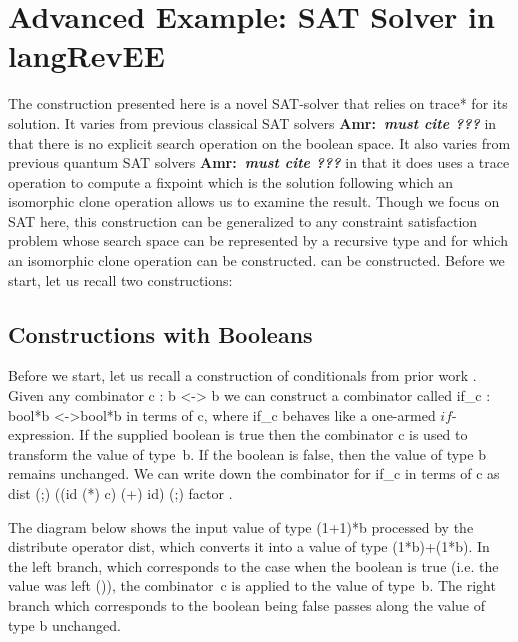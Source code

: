 \documentclass[preprint]{sigplanconf}
\newcommand{\xcomment}[2]{\textbf{#1:~\textsl{#2}}}
\newcommand{\amr}[1]{\xcomment{Amr}{#1}}
\begin{document}
\section{Advanced Example: SAT Solver in {{langRevEE}} }
\label{sec:prog}
\label{sec:sat-solver}


The construction presented here is a novel SAT-solver that relies on
{{trace*}} for its solution. It varies from previous classical SAT solvers
\amr{must cite ???} in that there is no explicit search operation on the
boolean space. It also varies from previous quantum SAT solvers \amr{must
  cite ???} in that it does uses a {{trace}} operation to compute a fixpoint
which is the solution following which an isomorphic clone operation allows us
to examine the result.  Though we focus on SAT here, this construction can be
generalized to any constraint satisfaction problem whose search space can be
represented by a recursive type and for which an isomorphic clone operation
can be constructed. 
can be constructed. Before we start, let us recall two constructions:

\subsection{Constructions with Booleans}

Before we start, let us recall a construction of conditionals from
prior work \cite{infeffects}.  Given any combinator {{c : b <-> b}} we
can construct a combinator called {{if_c : bool*b <->bool*b}} in terms
of {{c}}, where {{if_c}} behaves like a one-armed
$\mathit{if}$-expression. If the supplied boolean is {{true}} then the
combinator {{c}} is used to transform the value of type~{{b}}. If the
boolean is {{false}}, then the value of type {{b}} remains
unchanged. We can write down the combinator for {{if_c}} in terms of
{{c}} as {{ dist (;) ((id (*) c) (+) id) (;) factor }}.


The diagram below shows the input value of type {{(1+1)*b}} processed
by the distribute operator {{dist}}, which converts it into a value of
type {{(1*b)+(1*b)}}. In the {{left}} branch, which corresponds to the
case when the boolean is {{true}} (i.e. the value was {{left ()}}),
the combinator~{{c}} is applied to the value of type~{{b}}. The right
branch which corresponds to the boolean being {{false}} passes along
the value of type {{b}} unchanged.
\end{document}
